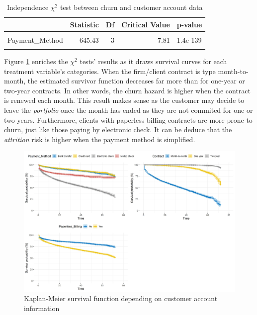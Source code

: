 \documentclass[
]{book}
\begin{document}
\begin{table}[H]

\caption{\label{tab:chi2custaccount}Independence $\chi^2$ test between churn and customer account data}
\centering
\begin{tabular}[t]{lrrrl}
\toprule
  & Statistic & Df & Critical Value & p-value\\
\midrule
\cellcolor{gray!6}{Contract} & \cellcolor{gray!6}{1179.55} & \cellcolor{gray!6}{2} & \cellcolor{gray!6}{5.99} & \cellcolor{gray!6}{7.3e-257}\\
Payment\_Method & 645.43 & 3 & 7.81 & 1.4e-139\\
\cellcolor{gray!6}{Paperless\_Billing} & \cellcolor{gray!6}{256.87} & \cellcolor{gray!6}{1} & \cellcolor{gray!6}{3.84} & \cellcolor{gray!6}{8.2e-58}\\
\bottomrule
\end{tabular}
\end{table}

Figure \ref{fig:kmcustaccount} enriches the \(\chi^2\) tests' results as it draws survival curves for each treatment variable's categories. When the firm/client contract is type month-to-month, the estimated survivor function decreases far more than for one-year or two-year contracts. In other words, the churn hazard is higher when the contract is renewed each month. This result makes sense as the customer may decide to leave the \emph{portfolio} once the month has ended as they are not commited for one or two years. Furthermore, clients with paperless billing contracts are more prone to churn, just like those paying by electronic check. It can be deduce that the \emph{attrition} risk is higher when the payment method is simplified.

\begin{figure}

{\centering \includegraphics[width=50in]{./imgs/account_info_plot} 

}

\caption{Kaplan-Meier survival function depending on customer account information}\label{fig:kmcustaccount}
\end{figure}
\end{document}
